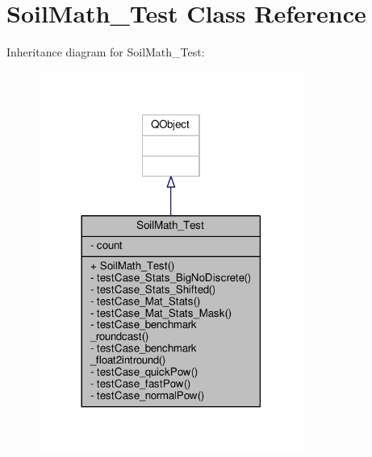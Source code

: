 \hypertarget{class_soil_math___test}{}\section{Soil\+Math\+\_\+\+Test Class Reference}
\label{class_soil_math___test}


Inheritance diagram for Soil\+Math\+\_\+\+Test\+:\nopagebreak
\begin{figure}[H]
\begin{center}
\leavevmode
\includegraphics[width=246pt]{class_soil_math___test__inherit__graph}
\end{center}
\end{figure}


